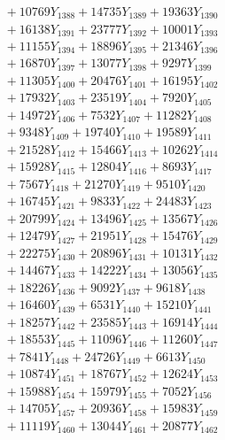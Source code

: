 \documentclass[a4paper,10pt]{article}
\begin{document}
{\begin{align}
&\;  + 10769 Y_{1388} + 14735 Y_{1389} + 19363 Y_{1390} \\[0.3ex]
&\;  + 16138 Y_{1391} + 23777 Y_{1392} + 10001 Y_{1393} \\[0.3ex]
&\;  + 11155 Y_{1394} + 18896 Y_{1395} + 21346 Y_{1396} \\[0.3ex]
&\;  + 16870 Y_{1397} + 13077 Y_{1398} + 9297 Y_{1399} \\[0.3ex]
&\;  + 11305 Y_{1400} + 20476 Y_{1401} + 16195 Y_{1402} \\[0.3ex]
&\;  + 17932 Y_{1403} + 23519 Y_{1404} + 7920 Y_{1405} \\[0.3ex]
&\;  + 14972 Y_{1406} + 7532 Y_{1407} + 11282 Y_{1408} \\[0.5ex]\allowbreak
&\;  + 9348 Y_{1409} + 19740 Y_{1410} + 19589 Y_{1411} \\[0.3ex]
&\;  + 21528 Y_{1412} + 15466 Y_{1413} + 10262 Y_{1414} \\[0.3ex]
&\;  + 15928 Y_{1415} + 12804 Y_{1416} + 8693 Y_{1417} \\[0.3ex]
&\;  + 7567 Y_{1418} + 21270 Y_{1419} + 9510 Y_{1420} \\[0.3ex]
&\;  + 16745 Y_{1421} + 9833 Y_{1422} + 24483 Y_{1423} \\[0.3ex]
&\;  + 20799 Y_{1424} + 13496 Y_{1425} + 13567 Y_{1426} \\[0.3ex]
&\;  + 12479 Y_{1427} + 21951 Y_{1428} + 15476 Y_{1429} \\[0.3ex]
&\;  + 22275 Y_{1430} + 20896 Y_{1431} + 10131 Y_{1432} \\[0.3ex]
&\;  + 14467 Y_{1433} + 14222 Y_{1434} + 13056 Y_{1435} \\[0.3ex]
&\;  + 18226 Y_{1436} + 9092 Y_{1437} + 9618 Y_{1438} \\[0.5ex]\allowbreak
&\;  + 16460 Y_{1439} + 6531 Y_{1440} + 15210 Y_{1441} \\[0.3ex]
&\;  + 18257 Y_{1442} + 23585 Y_{1443} + 16914 Y_{1444} \\[0.3ex]
&\;  + 18553 Y_{1445} + 11096 Y_{1446} + 11260 Y_{1447} \\[0.3ex]
&\;  + 7841 Y_{1448} + 24726 Y_{1449} + 6613 Y_{1450} \\[0.3ex]
&\;  + 10874 Y_{1451} + 18767 Y_{1452} + 12624 Y_{1453} \\[0.3ex]
&\;  + 15988 Y_{1454} + 15979 Y_{1455} + 7052 Y_{1456} \\[0.3ex]
&\;  + 14705 Y_{1457} + 20936 Y_{1458} + 15983 Y_{1459} \\[0.3ex]
&\;  + 11119 Y_{1460} + 13044 Y_{1461} + 20877 Y_{1462} \\[0.3ex]

\end{align}}
\end{document}
